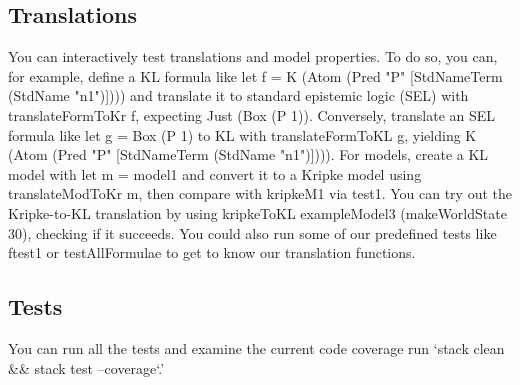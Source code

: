 \documentclass[12pt,a4paper]{article}
\begin{document}
\subsection{Translations}
You can interactively test translations and model properties. To do so, you can, for example, define a KL formula like let f = K (Atom (Pred "P" [StdNameTerm (StdName "n1")]))) and translate it to standard epistemic logic (SEL) with translateFormToKr f, expecting Just (Box (P 1)). 
Conversely, translate an SEL formula like let g = Box (P 1) to KL with translateFormToKL g, yielding K (Atom (Pred "P" [StdNameTerm (StdName "n1")]))). 
For models, create a KL model with let m = model1 and convert it to a Kripke model using translateModToKr m, then compare with kripkeM1 via test1. You can try out the Kripke-to-KL translation by using kripkeToKL exampleModel3 (makeWorldState 30), checking if it succeeds. You could also run some of our predefined tests like ftest1 or testAllFormulae to get to know our translation functions.

\subsection{Tests}
You can run all the tests and examine the current code coverage run `stack clean && stack test --coverage`.'

%

% 
\end{document}
